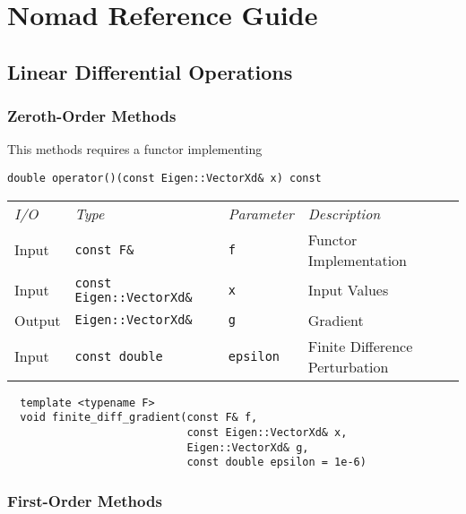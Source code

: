 \chapter{Nomad Reference Guide} \label{chap:reference_guide}

\section{Linear Differential Operations} \label{sec:differential_operations}

\subsection{Zeroth-Order Methods}

This methods requires a functor implementing
%
\begin{verbatim}
double operator()(const Eigen::VectorXd& x) const
\end{verbatim}

\begin{tcolorbox}[colback=white,colframe=gray90, coltitle=black,boxrule=3pt,
fonttitle=\bfseries,title=Finite Difference Gradient]

\begin{tabular}{llll}
\textit{I/O} & \textit{Type} & \textit{Parameter} & \textit{Description} \\
Input & \texttt{const F\&} & \texttt{f} & Functor Implementation \\
Input & \texttt{const Eigen::VectorXd\&} & \texttt{x} & Input Values \\
Output & \texttt{Eigen::VectorXd\&} & \texttt{g} & Gradient \\
Input & \texttt{const double} & \texttt{epsilon} & Finite Difference Perturbation
\end{tabular}

\vspace{5mm}

\begin{verbatim}
  template <typename F>
  void finite_diff_gradient(const F& f,
                            const Eigen::VectorXd& x,
                            Eigen::VectorXd& g,
                            const double epsilon = 1e-6)
\end{verbatim}

\end{tcolorbox}

\subsection{First-Order Methods}

